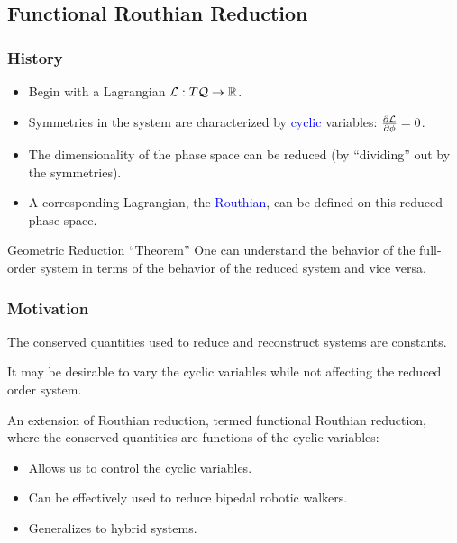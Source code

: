 \documentclass{beamer}
\begin{document}
\subsection{Functional Routhian Reduction}
\begin{frame}
  \frametitle{History}
  \begin{description}[D]
  \item[ Geometric reduction\footnote{For more on geometric reduction, see [Marsden, Springer-Verlag 1994]}:] \hspace{5cm}

    \begin{itemize}
    \item Begin with a Lagrangian $\mathcal{L} : T\mathcal{Q} \to \mathbb{R}$.
    \item Symmetries in the system are characterized by \textcolor{blue}{cyclic}
      variables: $\frac{\partial \mathcal{L}}{\partial \phi} = 0$.
    \item The dimensionality of the phase space can be reduced (by ``dividing'' out by the symmetries).
    \item A corresponding Lagrangian, the \textcolor{blue}{Routhian}, can be defined on this reduced phase space.
    \end{itemize}
  \end{description}

  \begin{block}{Geometric Reduction ``Theorem''}
    One can understand the behavior of the full-order system in terms of
    the behavior of the reduced system and vice versa.
  \end{block}
\end{frame}

\begin{frame}
  \frametitle{Motivation}
  \begin{description}[D]
  \item[ Classical Reduction:]  The conserved quantities used to reduce and reconstruct systems are constants.
  \item[ Yet:]  It may be desirable to \alert{vary} the cyclic variables while not affecting the reduced order system.
  \item[ Motivates:]  An extension of Routhian reduction, termed \alert{functional Routhian reduction}, where the conserved quantities are functions of the cyclic variables:
    \begin{itemize}
    \item Allows us to control the cyclic variables.
    \item Can be effectively used to reduce bipedal robotic walkers.
    \item Generalizes to hybrid systems.
    \end{itemize}
  \end{description}
\end{frame}
\end{document}
